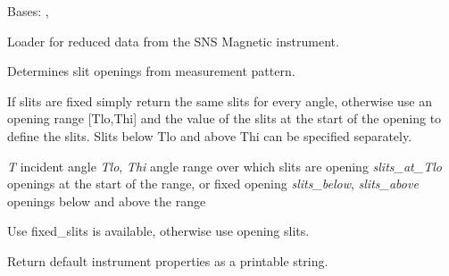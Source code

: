 \documentclass[letterpaper,10pt,english]{sphinxmanual}
\begin{document}
\begin{fulllineitems}
\label{api/snsdata:refl1d.snsdata.Magnetic}
Bases: {\hyperref[api/snsdata:refl1d.snsdata.SNSData]{}}, {\hyperref[api/instrument:refl1d.instrument.Pulsed]{}}

Loader for reduced data from the SNS Magnetic instrument.

\begin{fulllineitems}
\label{api/snsdata:refl1d.snsdata.Magnetic.calc_dT}
\end{fulllineitems}


\begin{fulllineitems}
\label{api/snsdata:refl1d.snsdata.Magnetic.calc_slits}
Determines slit openings from measurement pattern.

If slits are fixed simply return the same slits for every angle,
otherwise use an opening range {[}Tlo,Thi{]} and the value of the
slits at the start of the opening to define the slits.  Slits
below Tlo and above Thi can be specified separately.

\emph{T}              incident angle
\emph{Tlo}, \emph{Thi}     angle range over which slits are opening
\emph{slits\_at\_Tlo}   openings at the start of the range, or fixed opening
\emph{slits\_below}, \emph{slits\_above}   openings below and above the range

Use fixed\_slits is available, otherwise use opening slits.

\end{fulllineitems}


\begin{fulllineitems}
\label{api/snsdata:refl1d.snsdata.Magnetic.defaults}
Return default instrument properties as a printable string.

\end{fulllineitems}



\end{fulllineitems}
\end{document}
